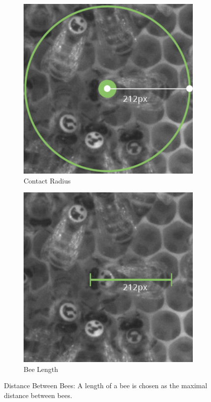 \begin{figure}[htb]
	\centering
	\begin{subfigure}[b]{0.4\textwidth}
		\centering
		\includegraphics[width=\textwidth]{Figures/radius}
		\caption[Contact Radius]{Contact Radius}
		\label{fig:radius}
	\end{subfigure}
	\begin{subfigure}[b]{0.4\textwidth}
		\includegraphics[width=\textwidth]{Figures/sizeTagBee}
		\caption[Bee and Tag Size]{Bee Length}
		\label{fig:size}
	\end{subfigure}
	\caption{Distance Between Bees: A length of a bee is chosen as the maximal  distance between bees.}
	\label{fig:contactRadius}
\end{figure}